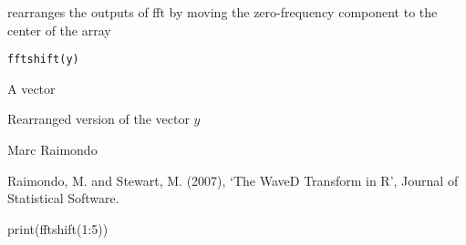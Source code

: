 \documentclass{article}
\begin{document}
\begin{Description}\relax
rearranges the outputs of fft by moving 
the zero-frequency component to the center of the array
\end{Description}
\begin{Usage}
\begin{verbatim}
fftshift(y)
\end{verbatim}
\end{Usage}
\begin{Arguments}
\begin{ldescription}
\item[\code{y}] A vector
\end{ldescription}
\end{Arguments}
\begin{Value}
Rearranged version of the vector $y$
\end{Value}
\begin{Author}\relax
Marc Raimondo
\end{Author}
\begin{References}\relax
Raimondo, M. and Stewart, M. (2007),
`The WaveD Transform in R', Journal of Statistical Software.
\end{References}
\begin{SeeAlso}\relax
{}
\end{SeeAlso}
\begin{Examples}
\begin{ExampleCode} print(fftshift(1:5))\end{ExampleCode}
\end{Examples}
\end{document}
